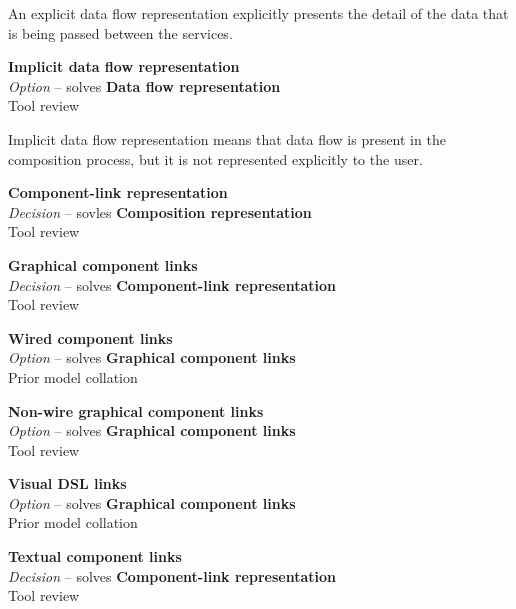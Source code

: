 An explicit data flow representation explicitly presents the detail of the data that is being passed between the services.

\textbf{Implicit data flow representation} \\ \emph{Option} -- solves \textbf{Data flow representation} \\ Tool review

Implicit data flow representation means that data flow is present in the composition process, but it is not represented explicitly to the user.

\textbf{Component-link representation} \\ \emph{Decision} -- sovles \textbf{Composition representation} \\ Tool review



\textbf{Graphical component links} \\ \emph{Decision} -- solves \textbf{Component-link representation} \\ Tool review

\textbf{Wired component links} \\ \emph{Option} -- solves \textbf{Graphical component links} \\ Prior model collation \cite{Grammel2010,Aghaee2012,Minhas2012,Fischer2009,Pietschmann2010}


\textbf{Non-wire graphical component links} \\ \emph{Option} -- solves \textbf{Graphical component links} \\ Tool review

\textbf{Visual DSL links} \\ \emph{Option} -- solves \textbf{Graphical component links} \\ Prior model collation \cite{Grammel2010,Aghaee2012}

\textbf{Textual component links} \\ \emph{Decision} -- solves \textbf{Component-link representation} \\ Tool review

